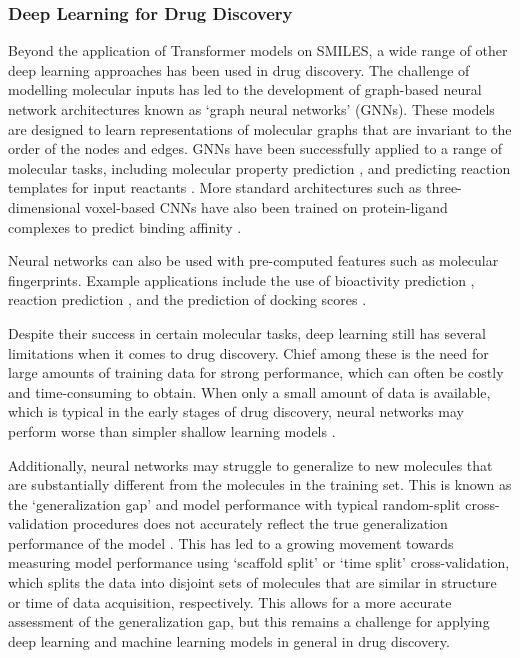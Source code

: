\subsubsection{Deep Learning for Drug Discovery}

Beyond the application of Transformer models on SMILES, a wide range of other deep learning approaches has been used in drug discovery. The challenge of modelling molecular inputs has led to the development of graph-based neural network architectures known as `graph neural networks' (GNNs). These models are designed to learn representations of molecular graphs that are invariant to the order of the nodes and edges. GNNs have been successfully applied to a range of molecular tasks, including molecular property prediction \cite{wu2017molnet, Gilmer17mpnn, Mayr2018compare, yang2019chemprop}, and predicting reaction templates for input reactants \cite{Coley19WLDN5}. More standard architectures such as three-dimensional voxel-based CNNs have also been trained on protein-ligand complexes to predict binding affinity \cite{Ragoza2017ProteinCNN, Imrie2018ProteinCNN, Jimenez2018Kdeep}.

Neural networks can also be used with pre-computed features such as molecular fingerprints. Example applications include the use of bioactivity prediction \cite{Bender2019}, reaction prediction \cite{Wei2016reactionprediction, segler2017neural}, and the prediction of docking scores \cite{Gentile2020deepdocking}.

Despite their success in certain molecular tasks, deep learning still has several limitations when it comes to drug discovery. Chief among these is the need for large amounts of training data for strong performance, which can often be costly and time-consuming to obtain. When only a small amount of data is available, which is typical in the early stages of drug discovery, neural networks may perform worse than simpler shallow learning models \cite{Jiang2021benchmark}. 

Additionally, neural networks may struggle to generalize to new molecules that are substantially different from the molecules in the training set. This is known as the `generalization gap' and model performance with typical random-split cross-validation procedures does not accurately reflect the true generalization performance of the model \cite{Sheridan2013TimeSplit}. This has led to a growing movement towards measuring model performance using `scaffold split' \cite{wu2017molnet, yang2019chemprop} or `time split' \cite{Sheridan2013TimeSplit} cross-validation, which splits the data into disjoint sets of molecules that are similar in structure or time of data acquisition, respectively. This allows for a more accurate assessment of the generalization gap, but this remains a challenge for applying deep learning and machine learning models in general in drug discovery.

